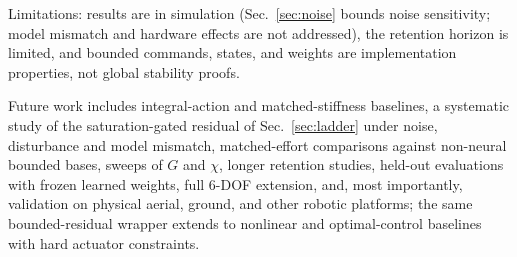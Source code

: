 \documentclass[letterpaper, 10 pt, conference]{ieeeconf}
\newcommand{\clip}{\operatorname{clip}}
\begin{document}
Limitations: results are in simulation (Sec.~\ref{sec:noise} bounds noise sensitivity; model mismatch and hardware effects are not addressed), the retention horizon is limited, and bounded commands, states, and weights are implementation properties, not global stability proofs.

Future work includes integral-action and matched-stiffness baselines, a systematic study of the saturation-gated residual of Sec.~\ref{sec:ladder} under noise, disturbance and model mismatch, matched-effort comparisons against non-neural bounded bases, sweeps of $G$ and $\chi$, longer retention studies, held-out evaluations with frozen learned weights, full 6-DOF extension, and, most importantly, validation on physical aerial, ground, and other robotic platforms; the same bounded-residual wrapper extends to nonlinear and optimal-control baselines with hard actuator constraints.







\end{document}

